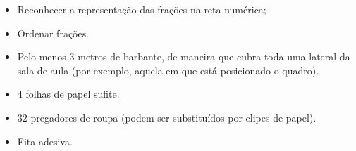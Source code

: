 \begin{multicols}{2}
\begin{itemize} %
  \item     Reconhecer a representação das frações na reta numérica;
  \item     Ordenar frações. 
\end{itemize} %

\begin{itemize} %
  \item     Pelo menos     $3$     metros de barbante, de maneira que cubra toda uma lateral da sala de aula (por exemplo, aquela em que está posicionado o quadro). 
  \item         $4$     folhas de papel sufite. 
  \item         $32$     pregadores de roupa (podem ser substituídos por clipes de papel).
  \item     Fita adesiva.
\end{itemize} %


\end{multicols}
